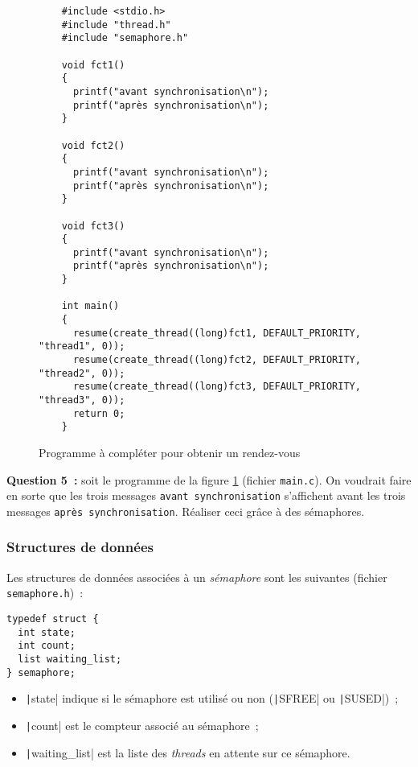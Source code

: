 \documentclass[a4paper]{article}
\begin{document}
\begin{figure}[!htpb]
\begin{verbatim}
    #include <stdio.h>
    #include "thread.h"
    #include "semaphore.h"

    void fct1()
    {
      printf("avant synchronisation\n");
      printf("après synchronisation\n");
    }

    void fct2()
    {
      printf("avant synchronisation\n");
      printf("après synchronisation\n");
    }

    void fct3()
    {
      printf("avant synchronisation\n");
      printf("après synchronisation\n");
    }

    int main()
    {
      resume(create_thread((long)fct1, DEFAULT_PRIORITY, "thread1", 0));
      resume(create_thread((long)fct2, DEFAULT_PRIORITY, "thread2", 0));
      resume(create_thread((long)fct3, DEFAULT_PRIORITY, "thread3", 0));
      return 0;
    }
\end{verbatim}
\caption{Programme à compléter pour obtenir un rendez-vous}
\label{fig:prog4}
\end{figure}

\textbf{Question 5~:} soit le programme de la figure \ref{fig:prog4} (fichier \verb+main.c+). On voudrait faire en sorte que les trois messages \verb+avant synchronisation+ s'affichent avant les trois messages \verb+après synchronisation+. Réaliser ceci grâce à des sémaphores.

\subsubsection{Structures de données}

Les structures de données associées à un \emph{sémaphore} sont les suivantes (fichier \verb+semaphore.h+)~:

\begin{verbatim}
typedef struct {
  int state;
  int count;
  list waiting_list;
} semaphore;
\end{verbatim}

\begin{itemize}
\item \texttt|state| indique si le sémaphore est utilisé ou non (\texttt|SFREE| ou \texttt|SUSED|)~;\\

\item \texttt|count| est le compteur associé au sémaphore~;\\

\item \texttt|waiting_list| est la liste des \emph{threads} en attente sur ce sémaphore.\\

\end{itemize}
\end{document}
